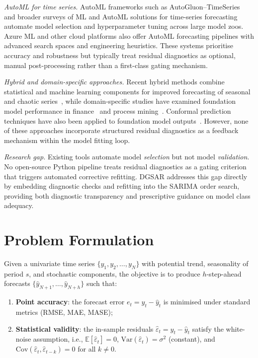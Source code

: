 \documentclass[sn-mathphys-num,pdflatex]{sn-jnl}
\begin{document}
\textit{AutoML for time series.}
AutoML frameworks such as AutoGluon--TimeSeries~\cite{shchur2023autogluon}
and broader surveys of ML and AutoML solutions for time-series
forecasting~\cite{alsharef2022automlreview} automate model selection and
hyperparameter tuning across large model zoos. Azure ML and other cloud
platforms also offer AutoML forecasting pipelines with advanced search
spaces and engineering heuristics. These systems prioritise accuracy
and robustness but typically treat residual diagnostics as optional,
manual post-processing rather than a first-class gating mechanism.

\textit{Hybrid and domain-specific approaches.}
Recent hybrid methods combine statistical and machine learning
components for improved forecasting of seasonal and chaotic
series~\cite{abbasimehr2024hybrid}, while domain-specific studies have
examined foundation model performance in finance~\cite{rahimikia2025finance}
and process mining~\cite{yu2025pmf}.  Conformal prediction
techniques have also been applied to foundation model
outputs~\cite{achour2025conformal}.  However, none of these approaches
incorporate structured residual diagnostics as a feedback mechanism
within the model fitting loop.

\textit{Research gap.}
Existing tools automate model \emph{selection} but not model
\emph{validation}.  No open-source Python pipeline treats residual
diagnostics as a gating criterion that triggers automated corrective
refitting.  DGSAR addresses this gap directly by embedding
diagnostic checks and refitting into the SARIMA order search,
providing both diagnostic transparency and prescriptive guidance
on model class adequacy.

\section{Problem Formulation}
\label{sec:problem}

Given a univariate time series $\{y_1, y_2, \ldots, y_N\}$ with
potential trend, seasonality of period $s$, and stochastic components,
the objective is to produce $h$-step-ahead forecasts
$\{\hat{y}_{N+1}, \ldots, \hat{y}_{N+h}\}$ such that:
\begin{enumerate}
\item \textbf{Point accuracy}: the forecast error
$e_t = y_t - \hat{y}_t$ is minimised under standard metrics
(RMSE, MAE, MASE);
\item \textbf{Statistical validity}: the in-sample residuals
$\hat{\varepsilon}_t = y_t - \hat{y}_t$ satisfy the white-noise
assumption, i.e., $\mathbb{E}[\hat{\varepsilon}_t] = 0$,
$\text{Var}(\hat{\varepsilon}_t) = \sigma^2$ (constant), and
$\text{Cov}(\hat{\varepsilon}_t, \hat{\varepsilon}_{t-k}) = 0$
for all $k \neq 0$.
\end{enumerate}
\end{document}
